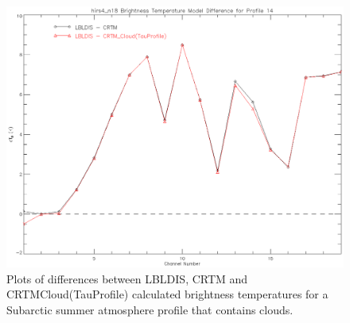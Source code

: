 \begin{figure}[htp]
  \centering{}
  \includegraphics[scale=0.8]{./graphics/SubArctic_Clouds_14.eps}
  \caption{Plots of differences between LBLDIS, CRTM and CRTM\textunderscore{}Cloud(TauProfile) calculated brightness temperatures for 
   a Subarctic summer atmosphere profile that contains clouds.}
  \label{fig:SubArctic_Cloud}
\end{figure} 


